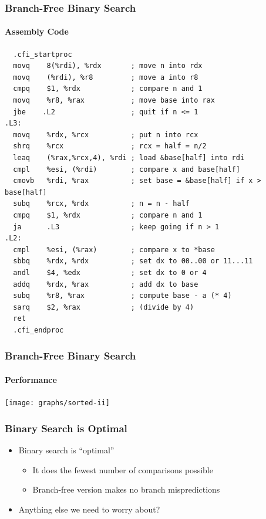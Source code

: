 \documentclass[xcolor=dvipsnames]{beamer}
\begin{document}
\begin{frame}[fragile]
   \frametitle{Branch-Free Binary Search}
   \framesubtitle{Assembly Code}

\tiny
\begin{verbatim}
  .cfi_startproc
  movq    8(%rdi), %rdx       ; move n into rdx
  movq    (%rdi), %r8         ; move a into r8
  cmpq    $1, %rdx            ; compare n and 1
  movq    %r8, %rax           ; move base into rax
  jbe    .L2                  ; quit if n <= 1
.L3:
  movq    %rdx, %rcx          ; put n into rcx
  shrq    %rcx                ; rcx = half = n/2
  leaq    (%rax,%rcx,4), %rdi ; load &base[half] into rdi
  cmpl    %esi, (%rdi)        ; compare x and base[half]
  cmovb   %rdi, %rax          ; set base = &base[half] if x > base[half]
  subq    %rcx, %rdx          ; n = n - half
  cmpq    $1, %rdx            ; compare n and 1
  ja      .L3                 ; keep going if n > 1
.L2:
  cmpl    %esi, (%rax)        ; compare x to *base
  sbbq    %rdx, %rdx          ; set dx to 00..00 or 11...11
  andl    $4, %edx            ; set dx to 0 or 4 
  addq    %rdx, %rax          ; add dx to base
  subq    %r8, %rax           ; compute base - a (* 4)
  sarq    $2, %rax            ; (divide by 4)
  ret
  .cfi_endproc
\end{verbatim}
\end{frame}

\begin{frame}[fragile]
   \frametitle{Branch-Free Binary Search}
   \framesubtitle{Performance}

   \begin{center}
     \texttt{[image: graphs/sorted-ii]}
   \end{center}
\end{frame}


\begin{frame}
   \frametitle{Binary Search is Optimal}

   \begin{itemize}
     \item Binary search is ``optimal''
     \begin{itemize}
       \item It does the fewest number of comparisons possible
       \item Branch-free version makes no branch mispredictions
     \end{itemize}
     \item Anything else we need to worry about?
   \end{itemize}
\end{frame}
\end{document}
